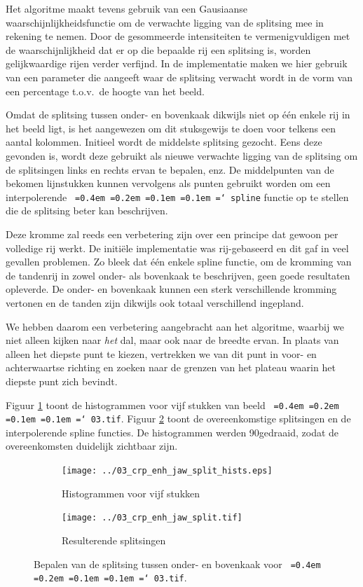 \documentclass[10pt,a4paper]{article}
\newcommand*\justify{%
  \fontdimen2\font=0.4em%
  \fontdimen3\font=0.2em%
  \fontdimen4\font=0.1em%
  \fontdimen7\font=0.1em%
  \hyphenchar\font=`\-%
}
\newcommand{\ttt}[1]{{\tt \justify{#1}}}
\begin{document}
Het algoritme maakt tevens gebruik van een Gausiaanse waarschijnlijkheidsfunctie om de verwachte ligging van de splitsing mee in rekening te nemen. Door de gesommeerde intensiteiten te vermenigvuldigen met de waarschijnlijkheid dat er op die bepaalde rij een splitsing is, worden gelijkwaardige rijen verder verfijnd. In de implementatie maken we hier gebruik van een parameter die aangeeft waar de splitsing verwacht wordt in de vorm van een percentage t.o.v.\ de hoogte van het beeld.

Omdat de splitsing tussen onder- en bovenkaak dikwijls niet op \'e\'en enkele rij in het beeld ligt, is het aangewezen om dit stuksgewijs te doen voor telkens een aantal kolommen. Initieel wordt de middelste splitsing gezocht. Eens deze gevonden is, wordt deze gebruikt als nieuwe verwachte ligging van de splitsing om de splitsingen links en rechts ervan te bepalen, enz. De middelpunten van de bekomen lijnstukken kunnen vervolgens als punten gebruikt worden om een interpolerende \ttt{spline} functie op te stellen die de splitsing beter kan beschrijven.

Deze kromme zal reeds een verbetering zijn over een principe dat gewoon per volledige rij werkt. De initi\"ele implementatie was rij-gebaseerd en dit gaf in veel gevallen problemen. Zo bleek dat \'e\'en enkele spline functie, om de kromming van de tandenrij in zowel onder- als bovenkaak te beschrijven, geen goede resultaten opleverde. De onder- en bovenkaak kunnen een sterk verschillende kromming vertonen en de tanden zijn dikwijls ook totaal verschillend ingepland.

We hebben daarom  een verbetering aangebracht aan het algoritme, waarbij we niet alleen kijken naar \emph{het} dal, maar ook naar de breedte ervan. In plaats van alleen het diepste punt te kiezen, vertrekken we van dit punt in voor- en achterwaartse richting en zoeken naar de grenzen van het plateau waarin het diepste punt zich bevindt.

Figuur \ref{fig:jaw_split_histograms} toont de histogrammen voor vijf stukken van beeld \ttt{03.tif}. Figuur \ref{fig:jaw_splits} toont de overeenkomstige splitsingen en de interpolerende spline functies. De histogrammen werden 90\degree gedraaid, zodat de overeenkomsten duidelijk zichtbaar zijn.

\begin{figure}
\centering
\begin{subfigure}{.49\textwidth}
  \centering
  \texttt{[image: ../03\_crp\_enh\_jaw\_split\_hists.eps]}
  \caption{Histogrammen voor vijf stukken}
  \label{fig:jaw_split_histograms}
\end{subfigure}
\begin{subfigure}{.49\textwidth}
  \centering
  \vspace{7mm}
  \texttt{[image: ../03\_crp\_enh\_jaw\_split.tif]}
  \caption{Resulterende splitsingen}
  \label{fig:jaw_splits}
\end{subfigure}
\caption{Bepalen van de splitsing tussen onder- en bovenkaak voor \ttt{03.tif}.}
\label{fig:jaw_split}
\end{figure}
\end{document}
